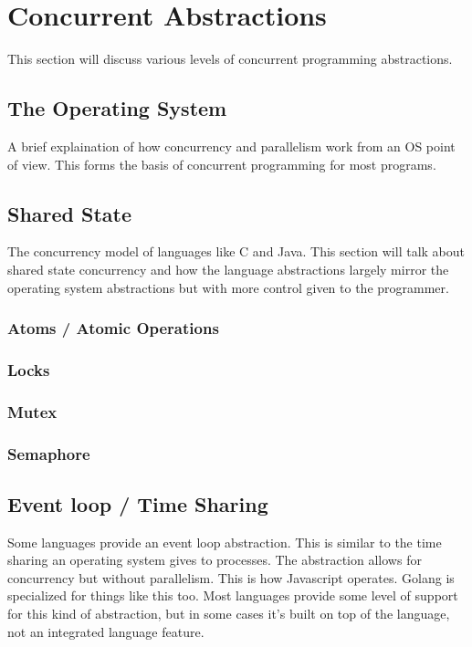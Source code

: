\documentclass{article}
\begin{document}
\section{Concurrent Abstractions}
This section will discuss various levels of
concurrent programming abstractions.

\subsection{The Operating System}
A brief explaination of how concurrency and parallelism work
from an OS point of view. This forms the basis of concurrent
programming for most programs.

\subsection{Shared State}
The concurrency model of languages like C and Java. This
section will talk about shared state concurrency and how the language
abstractions largely mirror the operating system abstractions but with
more control given to the programmer.

\subsubsection{Atoms / Atomic Operations}
\subsubsection{Locks}
\subsubsection{Mutex}
\subsubsection{Semaphore}

\subsection{Event loop / Time Sharing}
Some languages provide an event loop abstraction. This is similar
to the time sharing an operating system gives to processes. The abstraction
allows for concurrency but without parallelism. This is how Javascript operates.
Golang is specialized for things like this too. Most languages provide some
level of support for this kind of abstraction, but in some cases it's built on
top of the language, not an integrated language feature.
\end{document}
